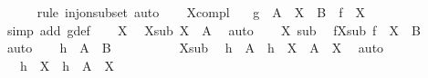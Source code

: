 \begin{isabellebody}
\ \ \ \ \isamarkupfalse%
\ {\isacharparenleft}{\kern0pt}rule\ inj{\isacharunderscore}{\kern0pt}on{\isacharunderscore}{\kern0pt}subset{\isacharparenright}{\kern0pt}\ auto\isanewline
\ \ \isamarkupfalse%
\ X{\isacharunderscore}{\kern0pt}compl\ \isamarkupfalse%
\ {\isacharasterisk}{\kern0pt}{\isacharcolon}{\kern0pt}\ {\isachardoublequoteopen}g{\isacharprime}{\kern0pt}\ {\isacharbackquote}{\kern0pt}\ {\isacharparenleft}{\kern0pt}A\ {\isacharminus}{\kern0pt}\ X{\isacharparenright}{\kern0pt}\ {\isacharequal}{\kern0pt}\ B\ {\isacharminus}{\kern0pt}\ {\isacharparenleft}{\kern0pt}f\ {\isacharbackquote}{\kern0pt}\ X{\isacharparenright}{\kern0pt}{\isachardoublequoteclose}\isanewline
\ \ \ \ \isamarkupfalse%
\ {\isacharparenleft}{\kern0pt}simp\ add{\isacharcolon}{\kern0pt}\ g{\isacharprime}{\kern0pt}{\isacharunderscore}{\kern0pt}def{\isacharparenright}{\kern0pt}\isanewline
\isanewline
\ \ \isamarkupfalse%
\ X\ \isamarkupfalse%
\ X{\isacharunderscore}{\kern0pt}sub{\isacharcolon}{\kern0pt}\ {\isachardoublequoteopen}X\ {\isasymsubseteq}\ A{\isachardoublequoteclose}\ \isamarkupfalse%
\ auto\isanewline
\ \ \isamarkupfalse%
\ X\ sub{}\ \isamarkupfalse%
\ fX{\isacharunderscore}{\kern0pt}sub{\isacharcolon}{\kern0pt}\ {\isachardoublequoteopen}f\ {\isacharbackquote}{\kern0pt}\ X\ {\isasymsubseteq}\ B{\isachardoublequoteclose}\ \isamarkupfalse%
\ auto\isanewline
\isanewline
\ \ \isamarkupfalse%
\ {\isachardoublequoteopen}{\isacharquery}{\kern0pt}h\ {\isacharbackquote}{\kern0pt}\ A\ {\isacharequal}{\kern0pt}\ B{\isachardoublequoteclose}\isanewline
\ \ \isamarkupfalse%
\ {\isacharminus}{\kern0pt}\isanewline
\ \ \ \ \isamarkupfalse%
\ X{\isacharunderscore}{\kern0pt}sub\ \isamarkupfalse%
\ {\isachardoublequoteopen}{\isacharquery}{\kern0pt}h\ {\isacharbackquote}{\kern0pt}\ A\ {\isacharequal}{\kern0pt}\ {\isacharquery}{\kern0pt}h\ {\isacharbackquote}{\kern0pt}\ {\isacharparenleft}{\kern0pt}X\ {\isasymunion}\ {\isacharparenleft}{\kern0pt}A\ {\isacharminus}{\kern0pt}\ X{\isacharparenright}{\kern0pt}{\isacharparenright}{\kern0pt}{\isachardoublequoteclose}\ \isamarkupfalse%
\ auto\isanewline
\ \ \ \ \isamarkupfalse%
\ \isamarkupfalse%
\ {\isachardoublequoteopen}{\isasymdots}\ {\isacharequal}{\kern0pt}\ {\isacharquery}{\kern0pt}h\ {\isacharbackquote}{\kern0pt}\ X\ {\isasymunion}\ {\isacharquery}{\kern0pt}h\ {\isacharbackquote}{\kern0pt}\ {\isacharparenleft}{\kern0pt}A\ {\isacharminus}{\kern0pt}\ X{\isacharparenright}{\kern0pt}{\isachardoublequoteclose}\ \isamarkupfalse%

\end{isabellebody}
